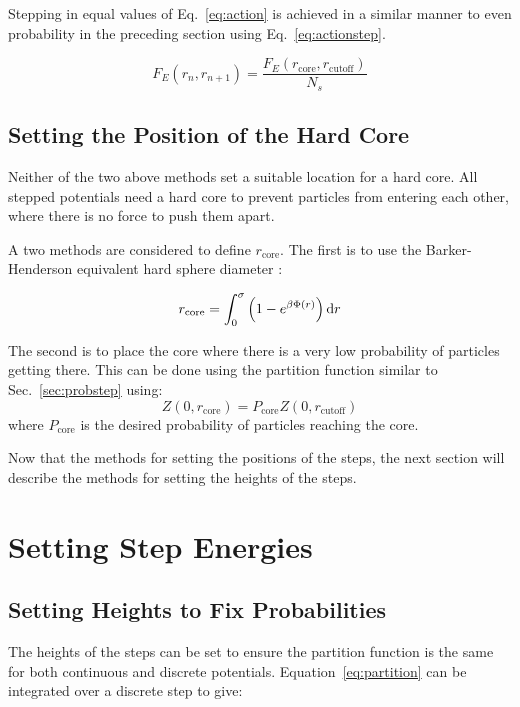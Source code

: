 \documentclass[12pt]{UoAthesis} \usepackage{booktabs}
\begin{document}
Stepping in equal values of Eq.~\eqref{eq:action} is achieved in a
similar manner to even probability in the preceding section using
Eq.~\eqref{eq:actionstep}.

\begin{equation}
  F_E(r_n, r_{n+1}) = \frac{F_E(r_{\text{core}}, r_{\text{cutoff}})}{N_s}
  \label{eq:actionstep}
\end{equation}
\subsection{Setting the Position of the Hard Core}
\label{sec:BHcore}
Neither of the two above methods set a suitable location for a hard
core.  All stepped potentials need a hard core to prevent particles
from entering each other, where there is no force to push them apart.

A two methods are considered to define $r_{\text{core}}$.  The
first is to use the Barker-Henderson equivalent hard sphere diameter
\cite{Barker1967a}: 

\begin{equation}
 r_{\text{core}}=\int^{\sigma}_{0}\left(1-e^{\beta\Phi(r)}\right){\rm d}r
\end{equation}

The second is to place the core where there is a very low probability
of particles getting there.  This can be done using the partition
function similar to Sec.~\ref{sec:probstep} using:
\begin{equation}
  Z(0, r_{\text{core}}) = P_{\text{core}}Z(0, r_{\text{cutoff}})
  \label{eq:probcore}
\end{equation}
where $P_{\text{core}}$ is the desired probability of particles reaching the core.

Now that the methods for setting the positions of the steps, the next
section will describe the methods for setting the heights of the steps.
\section{Setting Step Energies}
\label{sec:stepHeight}
\subsection{Setting Heights to Fix Probabilities}
\label{sec:eqProb}
The heights of the steps can be set to ensure the partition function
is the same for both continuous and discrete potentials.
Equation~\eqref{eq:partition} can be integrated over a discrete step
to give:
\end{document}
